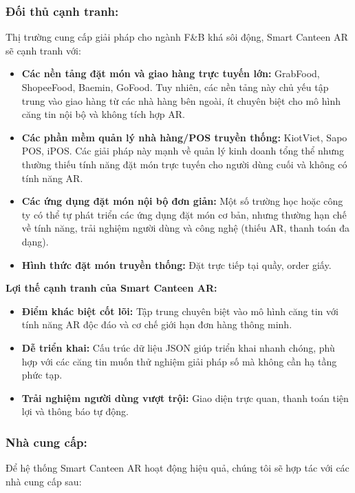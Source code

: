 \documentclass[12pt,a4paper]{article}
\begin{document}
\subsubsection{Đối thủ cạnh tranh:}
Thị trường cung cấp giải pháp cho ngành F\&B khá sôi động, Smart Canteen AR sẽ cạnh tranh với:

\begin{itemize}[label=\textbullet]
    \item \textbf{Các nền tảng đặt món và giao hàng trực tuyến lớn:} GrabFood, ShopeeFood, Baemin, GoFood. Tuy nhiên, các nền tảng này chủ yếu tập trung vào giao hàng từ các nhà hàng bên ngoài, ít chuyên biệt cho mô hình căng tin nội bộ và không tích hợp AR.
    \item \textbf{Các phần mềm quản lý nhà hàng/POS truyền thống:} KiotViet, Sapo POS, iPOS. Các giải pháp này mạnh về quản lý kinh doanh tổng thể nhưng thường thiếu tính năng đặt món trực tuyến cho người dùng cuối và không có tính năng AR.
    \item \textbf{Các ứng dụng đặt món nội bộ đơn giản:} Một số trường học hoặc công ty có thể tự phát triển các ứng dụng đặt món cơ bản, nhưng thường hạn chế về tính năng, trải nghiệm người dùng và công nghệ (thiếu AR, thanh toán đa dạng).
    \item \textbf{Hình thức đặt món truyền thống:} Đặt trực tiếp tại quầy, order giấy.
\end{itemize}

\textbf{Lợi thế cạnh tranh của Smart Canteen AR:}

\begin{itemize}[label=\textbullet]
    \item \textbf{Điểm khác biệt cốt lõi:} Tập trung chuyên biệt vào mô hình căng tin với tính năng AR độc đáo và cơ chế giới hạn đơn hàng thông minh.
    \item \textbf{Dễ triển khai:} Cấu trúc dữ liệu JSON giúp triển khai nhanh chóng, phù hợp với các căng tin muốn thử nghiệm giải pháp số mà không cần hạ tầng phức tạp.
    \item \textbf{Trải nghiệm người dùng vượt trội:} Giao diện trực quan, thanh toán tiện lợi và thông báo tự động.
\end{itemize}

\subsubsection{Nhà cung cấp:}
Để hệ thống Smart Canteen AR hoạt động hiệu quả, chúng tôi sẽ hợp tác với các nhà cung cấp sau:
\end{document}
